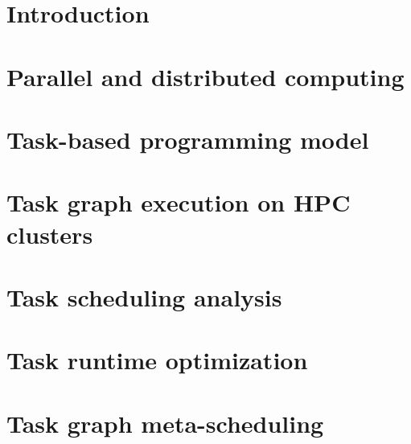 \documentclass[english,phd]{diploma}
\begin{document}
\MakeTitlePages

\printglossaries

\listoffigures
\clearpage

\listoftables
\clearpage

\lstlistoflistings
\clearpage

\nocite{estee, rsds, hyperqueue, ligate}

\chapter{Introduction}
\label{ch:Introduction}


\chapter{Parallel and distributed computing}
\label{ch:distributed-computing}


\chapter{Task-based programming model}
\label{ch:taskgraphs}


\chapter{Task graph execution on HPC clusters}
\label{ch:sota}


\chapter{Task scheduling analysis}
\label{ch:estee}


\chapter{Task runtime optimization}
\label{ch:rsds}


\chapter{Task graph meta-scheduling}
\label{ch:hyperqueue}

\end{document}
